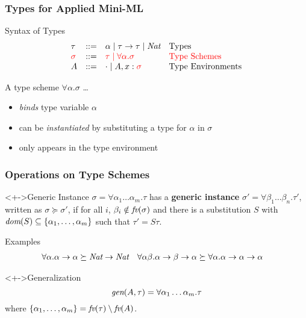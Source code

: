 \documentclass[pdftex,aspectratio=169]{beamer}
\begin{document}
\begin{frame}
  \frametitle{Types for Applied Mini-ML}
  \begin{block}{Syntax of Types}
    \begin{displaymath}
      \begin{array}{lcll}
        \tau & ::= & \alpha \mid \tau \to \tau \mid \textit{Nat} &
        \textrm{Types}\\\color{red}
        \sigma & ::= & \color{red} \tau \mid \forall \alpha. \sigma & 
        \color{red}\textrm{Type Schemes}\\
        A & ::= & \cdot \mid A, x:\color{red}\sigma &
        \textrm{Type Environments}
      \end{array}
    \end{displaymath}
  \end{block}
  A type scheme  $\forall\alpha.\sigma$ \dots
  \begin{itemize}
  \item \emph{binds} type variable $\alpha$
  \item can be \emph{instantiated} by substituting a type for $\alpha$
    in $\sigma$
  \item only appears in the type environment
  \end{itemize}
\end{frame}

\begin{frame}
  \frametitle{Operations on Type Schemes}
  \begin{block}<+->{Generic Instance}
    $\sigma = \forall\alpha_1\dots\alpha_m.\tau$ has a \textbf{generic
      instance}
    $\sigma' = \forall\beta_1\dots\beta_n.\tau'$, written as 
    $\sigma \succeq \sigma'$, if for all $i$, $\beta_i\notin
    \textit{fv} (\sigma)$ and there is a substitution $S$ with
    $\textit{dom} (S) \subseteq \{\alpha_1,\dots,\alpha_m\}$ such that $\tau' = S\tau$.
  \end{block}
  \begin{exampleblock}{Examples}\VSPBLS
    \begin{align*}
      \forall\alpha.\alpha\to\alpha &\succeq \textit{Nat}\to\textit{Nat}
      &
        \forall\alpha\beta.\alpha\to\beta\to\alpha
      & \succeq \forall \alpha. \alpha\to\alpha\to \alpha
    \end{align*}
  \end{exampleblock}
  \begin{block}<+->{Generalization}
    \begin{displaymath}
      \textit{gen} (A , \tau ) = \forall \alpha_1 \dots \alpha_m. \tau
    \end{displaymath}
    where $\{ \alpha_1,\dots, \alpha_m \} = \textit{fv} (\tau) \setminus \textit{fv} (A)$.
  \end{block}
\end{frame}
\end{document}
